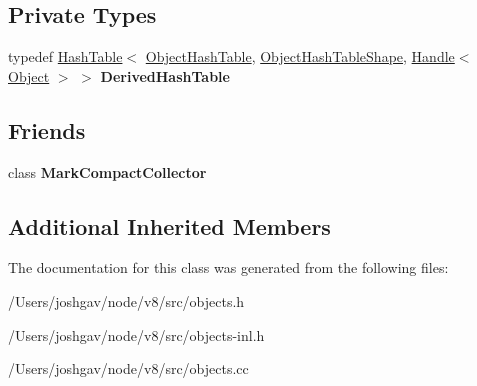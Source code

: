 \subsection*{Private Types}
\begin{DoxyCompactItemize}
\item 
typedef \hyperlink{classv8_1_1internal_1_1_hash_table}{Hash\+Table}$<$ \hyperlink{classv8_1_1internal_1_1_object_hash_table}{Object\+Hash\+Table}, \hyperlink{classv8_1_1internal_1_1_object_hash_table_shape}{Object\+Hash\+Table\+Shape}, \hyperlink{classv8_1_1internal_1_1_handle}{Handle}$<$ \hyperlink{classv8_1_1internal_1_1_object}{Object} $>$ $>$ {\bfseries Derived\+Hash\+Table}\hypertarget{classv8_1_1internal_1_1_object_hash_table_ad86c544fab8de70b4ad6575381804646}{}\label{classv8_1_1internal_1_1_object_hash_table_ad86c544fab8de70b4ad6575381804646}

\end{DoxyCompactItemize}
\subsection*{Friends}
\begin{DoxyCompactItemize}
\item 
class {\bfseries Mark\+Compact\+Collector}\hypertarget{classv8_1_1internal_1_1_object_hash_table_ae585a96455613b2bc2ae3ea75a061d8b}{}\label{classv8_1_1internal_1_1_object_hash_table_ae585a96455613b2bc2ae3ea75a061d8b}

\end{DoxyCompactItemize}
\subsection*{Additional Inherited Members}


The documentation for this class was generated from the following files\+:\begin{DoxyCompactItemize}
\item 
/\+Users/joshgav/node/v8/src/objects.\+h\item 
/\+Users/joshgav/node/v8/src/objects-\/inl.\+h\item 
/\+Users/joshgav/node/v8/src/objects.\+cc\end{DoxyCompactItemize}
